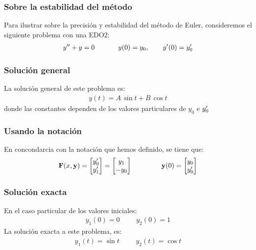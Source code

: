 \documentclass[12pt]{beamer}
\begin{document}
\begin{frame}
\frametitle{Sobre la estabilidad del método}
Para ilustrar sobre la precisión y estabilidad del método de Euler, consideremos el siguiente problema con una EDO2:
\pause
\begin{align*}
{y}^{\prime \prime} + y = 0 \hspace{1.2cm} y (0) = y_{0}, \hspace{0.7cm} {y}^{\prime} (0) = {y}^{\prime}_{0}
\end{align*}
\end{frame}
\begin{frame}
\frametitle{Solución general}
La solución general de este problema es:
\pause
\begin{align*}
y (t) = A \, \sin t + B \, \cos t
\end{align*}
\pause
donde las constantes dependen de los valores particulares de $y_{0}$ e ${y}^{\prime}_{0}$
\end{frame}
\begin{frame}
\frametitle{Usando la notación}
En concondarcia con la notación que hemos definido, se tiene que:
\pause
\begin{align*}
\mathbf{F} (x, \mathbf{y}) = 
\begin{bmatrix}
{y}^{\prime}_{0} \\
{y}^{\prime}_{1}
\end{bmatrix} =
\begin{bmatrix}
y_{1} \\
- y_{0}
\end{bmatrix}
\hspace{1.5cm}
\mathbf{y} (0) = 
\begin{bmatrix}
y_{0} \\
{y}^{\prime}_{0}
\end{bmatrix}
\end{align*}
\end{frame}
\begin{frame}
\frametitle{Solución exacta}
En el caso particular de los valores iniciales:
\pause
\begin{align*}
y_{1} (0) = 0 \hspace{1cm} y_{2} (0) = 1
\end{align*}
\pause
La solución exacta a este problema, es:
\pause
\begin{align*}
y_{1} (t) = \sin t \hspace{1cm} y_{2} (t) = \cos t
\end{align*}
\end{frame}
\end{document}

